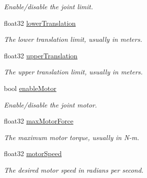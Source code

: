 \begin{DoxyCompactItemize}
\begin{DoxyCompactList}\small\item\em Enable/disable the joint limit. \end{DoxyCompactList}\item 
\hypertarget{structb2_prismatic_joint_def_ac0a0e2a669d640ebea354895fe6a9fb6}{float32 \hyperlink{structb2_prismatic_joint_def_ac0a0e2a669d640ebea354895fe6a9fb6}{lower\-Translation}}\label{structb2_prismatic_joint_def_ac0a0e2a669d640ebea354895fe6a9fb6}

\begin{DoxyCompactList}\small\item\em The lower translation limit, usually in meters. \end{DoxyCompactList}\item 
\hypertarget{structb2_prismatic_joint_def_ae3eac123c7fe543071bdfcd1a6942350}{float32 \hyperlink{structb2_prismatic_joint_def_ae3eac123c7fe543071bdfcd1a6942350}{upper\-Translation}}\label{structb2_prismatic_joint_def_ae3eac123c7fe543071bdfcd1a6942350}

\begin{DoxyCompactList}\small\item\em The upper translation limit, usually in meters. \end{DoxyCompactList}\item 
\hypertarget{structb2_prismatic_joint_def_a58ac79a54a8110d3a745e1d6d36990dc}{bool \hyperlink{structb2_prismatic_joint_def_a58ac79a54a8110d3a745e1d6d36990dc}{enable\-Motor}}\label{structb2_prismatic_joint_def_a58ac79a54a8110d3a745e1d6d36990dc}

\begin{DoxyCompactList}\small\item\em Enable/disable the joint motor. \end{DoxyCompactList}\item 
\hypertarget{structb2_prismatic_joint_def_aabeec48af1e49c7f9fed5e0bc8270a1b}{float32 \hyperlink{structb2_prismatic_joint_def_aabeec48af1e49c7f9fed5e0bc8270a1b}{max\-Motor\-Force}}\label{structb2_prismatic_joint_def_aabeec48af1e49c7f9fed5e0bc8270a1b}

\begin{DoxyCompactList}\small\item\em The maximum motor torque, usually in N-\/m. \end{DoxyCompactList}\item 
\hypertarget{structb2_prismatic_joint_def_ac4bdaea15653657e724a04fc60f3f235}{float32 \hyperlink{structb2_prismatic_joint_def_ac4bdaea15653657e724a04fc60f3f235}{motor\-Speed}}\label{structb2_prismatic_joint_def_ac4bdaea15653657e724a04fc60f3f235}

\begin{DoxyCompactList}\small\item\em The desired motor speed in radians per second. \end{DoxyCompactList}\end{DoxyCompactItemize}


